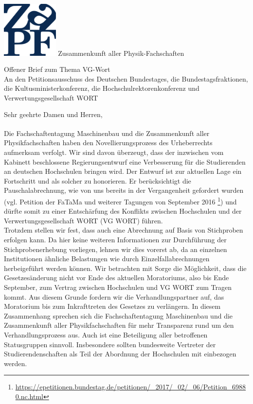 \documentclass[DIV=calc]{scrartcl}
\begin{document}
    \hspace{0.87\textwidth}
    \begin{minipage}{120pt}
        \vspace{-1.8cm}
        \includegraphics[width=80pt]{logo.pdf}
        \centering
        \small Zusammenkunft aller Physik-Fachschaften
    \end{minipage}
    \begin{center}
        \huge{Offener Brief zum Thema VG-Wort} \\
        \large{An den Petitionsausschuss des Deutschen Bundestages, die Bundestagsfraktionen, die Kultusministerkonferenz, die Hochschulrektorenkonferenz und Verwertungsgesellschaft WORT}
        \normalsize
    \end{center}
    \vspace{0.5cm}
    Sehr geehrte Damen und Herren,\\ 
\vspace{0.2cm}\\
Die Fachschaftentagung Maschinenbau und die Zusammenkunft aller Physikfachschaften haben den Novellierungsprozess des Urheberrechts aufmerksam verfolgt. Wir sind  davon überzeugt, dass der inzwischen vom Kabinett beschlossene  Regierungsentwurf eine Verbesserung für die Studierenden an deutschen  Hochschulen bringen wird. Der Entwurf ist zur aktuellen Lage ein  Fortschritt und als solcher zu honorieren. Er berücksichtigt die Pauschalabrechnung, wie von uns bereits in der Vergangenheit gefordert wurden (vgl. Petition der FaTaMa und weiterer Tagungen von September 2016 \footnote{\url{https://epetitionen.bundestag.de/petitionen/_2017/_02/_06/Petition_69880.nc.html}}) und dürfte somit zu einer Entschärfung des Konflikts zwischen  Hochschulen und der Verwertungsgesellschaft WORT (VG WORT) führen.\\
Trotzdem stellen wir fest, dass auch eine Abrechnung auf Basis von  Stichproben erfolgen kann. Da hier keine weiteren Informationen zur Durchführung  der Stichprobenerhebung vorliegen, lehnen wir dies vorerst ab, da an einzelnen Institutionen  ähnliche Belastungen wie durch Einzelfallabrechnungen herbeigeführt  werden können.
Wir betrachten mit Sorge die Möglichkeit, dass die  Gesetzesänderung nicht vor Ende des aktuellen Moratoriums, also bis Ende September, zum Vertrag zwischen Hochschulen und VG WORT zum Tragen  kommt. Aus diesem Grunde fordern wir die Verhandlungspartner auf, das  Moratorium bis zum Inkrafttreten des Gesetzes zu verlängern. In diesem  Zusammenhang sprechen sich die Fachschaftentagung Maschinenbau und die Zusammenkunft aller Physikfachschaften  für mehr Transparenz rund um den  Verhandlungsprozess aus. Auch ist eine Beteiligung aller betroffenen Statusgruppen  sinnvoll. Insbesondere sollten bundesweite Vertreter  der  Studierendenschaften als Teil der Abordnung der Hochschulen mit  einbezogen werden. 
\end{document}
